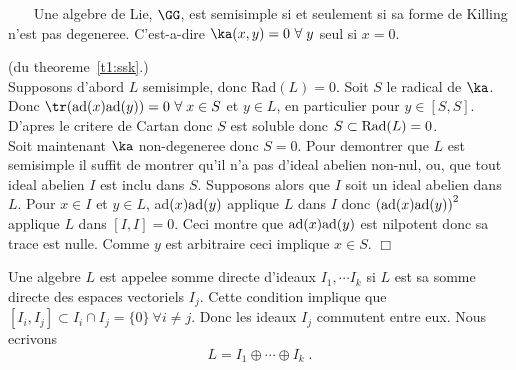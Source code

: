 \begin{ttt} ~~~ \label{t1:ssk}
 Une algebre de Lie, $\GG$, est  semisimple si et seulement si sa forme de Killing n'est pas degeneree.
C'est-a-dire $\ka(x,y) = 0 ~\forall\; y$ seul si $x=0$.
\end{ttt}

\begin{prv} (du theoreme~\ref{t1:ssk}.)\\
Supposons d'abord $L$  semisimple, donc Rad$(L) = 0$. Soit $S$ le radical de $\ka$. Donc
$\tr({\rm ad}(x){\rm ad}(y)) = 0~\forall \; x\in S$ et $y\in L$, en particulier pour $y\in [S,S]$. D'apres le 
critere de Cartan donc $S$ est soluble donc $S \subset {\rm Rad}(L)=0$.\\
Soit maintenant $\ka$ non-degeneree donc $S=0$. Pour demontrer que $L$ est  semisimple 
il suffit de montrer qu'il n'a pas d'ideal abelien non-nul, ou, que tout ideal abelien $I$ est inclu dans $S$. 
Supposons alors que $I$ soit un ideal abelien dans $L$. Pour $x\in I$ et $y\in L$, ad$(x){\rm ad}(y)$ 
applique $L$ dans $I$ donc $\left({\rm ad}(x){\rm ad}(y)\right)^2$
applique $L$ dans  $[I,I]=0$. Ceci montre que  ${\rm ad}(x){\rm ad}(y)$ est nilpotent donc sa trace est nulle.
Comme $y$ est arbitraire ceci implique $x\in S$. \hfill $\Box$
\end{prv}

\begin{ddd} Une algebre $L$ est appelee somme directe d'ideaux $I_1,\cdots I_k$ si $L$ est sa somme directe des espaces vectoriels $I_j$. Cette condition implique que $[I_i,I_j] \subset I_i\cap I_j = \{0\} ~\forall i\neq j$. Donc les
ideaux $I_j$ commutent entre eux. Nous ecrivons
$$  L = I_1 \oplus \cdots \oplus I_k \;.$$ 
\end{ddd}

